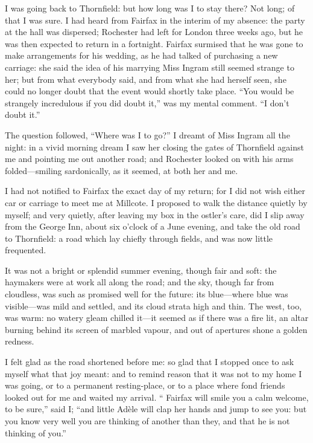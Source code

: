 I was going back to Thornfield: but how long was I to stay there? Not
long; of that I was sure. I had heard from \Mrs{} Fairfax in the interim
of my absence: the party at the hall was dispersed; \Mr{} Rochester had
left for London three weeks ago, but he was then expected to return in a
fortnight. \Mrs{} Fairfax surmised that he was gone to make arrangements
for his wedding, as he had talked of purchasing a new carriage: she said
the idea of his marrying Miss Ingram still seemed strange to her; but
from what everybody said, and from what she had herself seen, she could
no longer doubt that the event would shortly take place. \enquote{You
	would be strangely incredulous if you did doubt it,} was my mental
comment. \enquote{I don't doubt it.}

The question followed, \enquote{Where was I to go?} I dreamt of Miss
Ingram all the night: in a vivid morning dream I saw her closing the
gates of Thornfield against me and pointing me out another road; and \Mr{}
Rochester looked on with his arms folded---smiling sardonically, as it
seemed, at both her and me.

I had not notified to \Mrs{} Fairfax the exact day of my return; for I did
not wish either car or carriage to meet me at Millcote. I proposed to
walk the distance quietly by myself; and very quietly, after leaving my
box in the ostler's care, did I slip away from the George Inn, about six
o'clock of a June evening, and take the old road to Thornfield: a road
which lay chiefly through fields, and was now little frequented.

It was not a bright or splendid summer evening, though fair and soft:
the haymakers were at work all along the road; and the sky, though far
from cloudless, was such as promised well for the future: its
blue---where blue was visible---was mild and settled, and its cloud
strata high and thin. The west, too, was warm: no watery gleam chilled
it---it seemed as if there was a fire lit, an altar burning behind its
screen of marbled vapour, and out of apertures shone a golden redness.

I felt glad as the road shortened before me: so glad that I stopped once
to ask myself what that joy meant: and to remind reason that it was not
to my home I was going, or to a permanent resting-place, or to a place
where fond friends looked out for me and waited my arrival.
\enquote{\Mrs{} Fairfax will smile you a calm welcome, to be sure,} said
I; \enquote{and little Adèle will clap her hands and jump to see you:
	but you know very well you are thinking of another than they, and that
	he is not thinking of you.}

